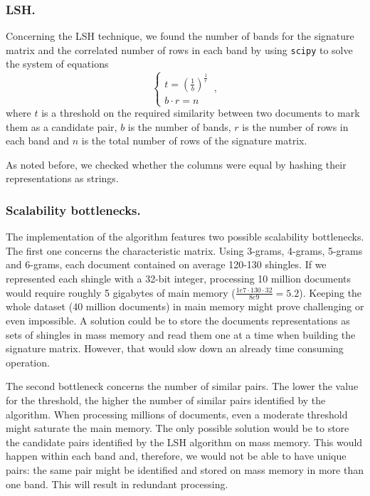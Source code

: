 \documentclass[runningheads]{llncs}
\begin{document}
\subsubsection{LSH.} Concerning the LSH technique, we found the number of bands for the signature matrix and the correlated number of rows in each band by using \texttt{scipy} to solve the system of equations
\begin{equation}
  \begin{cases}
    t = (\frac{1}{b})^\frac{1}{r}\\
    b \cdot r = n
  \end{cases}\,,
\end{equation}
where $t$ is a threshold on the required similarity between two documents to mark them as a candidate pair, $b$ is the number of bands, $r$ is the number of rows in each band and $n$ is the total number of rows of the signature matrix.

As noted before, we checked whether the columns were equal by hashing their representations as strings.

\subsubsection{Scalability bottlenecks.} The implementation of the algorithm features two possible scalability bottlenecks. The first one concerns the characteristic matrix. Using 3-grams, 4-grams, 5-grams and 6-grams, each document contained on average 120-130 shingles. If we represented each shingle with a 32-bit integer, processing 10 million documents would require roughly 5 gigabytes of main memory ($\frac{1e7 \cdot 130 \cdot 32}{8e9} = 5.2$). Keeping the whole dataset (40 million documents) in main memory might prove challenging or even impossible. A solution could be to store the documents representations as sets of shingles in mass memory and read them one at a time when building the signature matrix. However, that would slow down an already time consuming operation.

The second bottleneck concerns the number of similar pairs. The lower the value for the threshold, the higher the number of similar pairs identified by the algorithm. When processing millions of documents, even a moderate threshold might saturate the main memory. The only possible solution would be to store the candidate pairs identified by the LSH algorithm on mass memory. This would happen within each band and, therefore, we would not be able to have unique pairs: the same pair might be identified and stored on mass memory in more than one band. This will result in redundant processing. 
\end{document}
